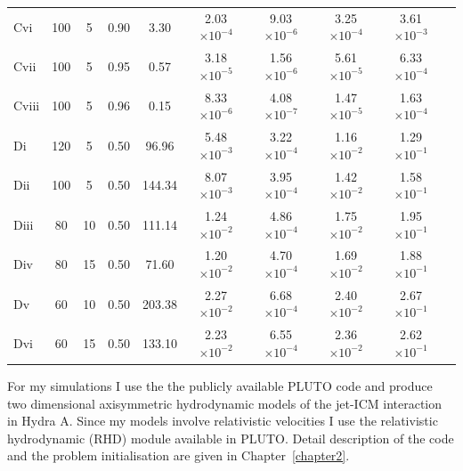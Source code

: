 \begin{table}
\begin{tabular}{l * {9}{c}}
	Cvi   & 100 & 5  &  0.90 &   3.30  &  2.03$\times10^{-4}$   &	9.03$\times10^{-6}$  	&  	 3.25$\times10^{-4}$	&       3.61$\times10^{-3}$	 \\
	Cvii   & 100 & 5 & 0.95  & 0.57  &  3.18$\times10^{-5}$	  &    1.56$\times10^{-6}$		&      5.61$\times10^{-5}$		&       6.33$\times10^{-4}$  \\
	Cviii  & 100 &  5  &  0.96  & 0.15  & 8.33$\times10^{-6}$	  &    4.08$\times10^{-7}$		&      1.47$\times10^{-5}$		&      1.63$\times10^{-4}$ \\
	\hline
	 Di 	& 120  & 5   &  0.50    & 96.96	  & 5.48$\times10^{-3}$	 & 	3.22$\times10^{-4}$ 	&	1.16$\times10^{-2}$		&  1.29$\times10^{-1}$	  \\
	 Dii 	& 100  & 5   &  0.50 & 144.34  & 8.07$\times10^{-3}$ &	3.95$\times10^{-4}$         &	1.42$\times10^{-2}$		&  1.58$\times10^{-1}$	  \\ 
	 Diii 	& 80    & 10   &  0.50  & 111.14  &  1.24$\times10^{-2}$    &	4.86$\times10^{-4}$		&	1.75$\times10^{-2}$ 	&  1.95$\times10^{-1}$	 \\
	 Div 	& 80    & 15   &  0.50  &  71.60 	  & 1.20$\times10^{-2}$     &	 4.70$\times10^{-4}$	& 	1.69$\times10^{-2}$		&  1.88$\times10^{-1}$  	 \\
	 Dv 	& 60    & 10   &  0.50  &  203.38  & 2.27$\times10^{-2}$     &	 6.68$\times10^{-4}$	&  	2.40$\times10^{-2}$		&  2.67$\times10^{-1}$ 	\\
	 Dvi 	& 60    & 15   &  0.50  &  133.10  & 2.23$\times10^{-2}$     &	 6.55$\times10^{-4}$	&  	2.36$\times10^{-2}$		&  2.62$\times10^{-1}$ 	\\
	 \hline
\end{tabular}
\label{t:sim_par}
\end{table}



For my simulations I use the the publicly available PLUTO code \citep{mignone07} and produce two dimensional axisymmetric hydrodynamic models of the jet-ICM interaction in Hydra A. Since my  models involve relativistic velocities I use the relativistic hydrodynamic (RHD) module available in PLUTO. Detail description of the code and the problem initialisation are given in Chapter~\ref{chapter2}.

